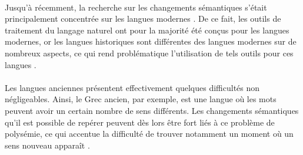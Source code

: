 \documentclass{article}
\begin{document}
\paragraph{}
Jusqu’à récemment, la recherche sur les changements sémantiques s’était principalement concentrée sur les langues modernes \cite{perrone2021lexical}. De ce fait, les outils de traitement du langage naturel ont pour la majorité été conçus pour les langues modernes, or les langues historiques sont différentes des langues modernes sur de nombreux aspects, ce qui rend problématique l’utilisation de tels outils pour ces langues \cite{di2021latin}.
\paragraph{}
Les langues anciennes présentent effectivement quelques difficultés non négligeables. Ainsi, le Grec ancien, par exemple, est une langue où les mots peuvent avoir un certain nombre de sens différents. Les changements sémantiques qu’il est possible de repérer peuvent dès lors être fort liés à ce problème de polysémie, ce qui accentue la difficulté de trouver notamment un moment où un sens nouveau apparaît \cite{perrone2019gasc}. 
\end{document}
